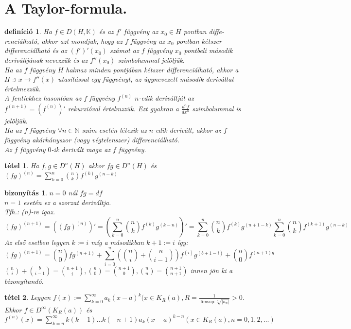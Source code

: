 \documentclass{article}
\newcommand{\K}{\mathbb{K}}
\newcommand{\N}{\mathbb{N}}
\newcommand{\n}{\rightarrow}
\newcommand{\di}{\displaystyle}
\theoremstyle{magyar}
\newtheorem{de}{definíció}[section]
\newtheorem{te}{tétel}[section]
\newtheorem{bi}{bizonyítás}[section]
\begin{document}
  \section{A Taylor-formula.}
  \begin{de}
    Ha $f\in D(H,\K)$ és az $f'$ függvény az $x_0\in H$ pontban diffe-renciálható, akkor azt mondjuk, hogy az $f$ függvény az $x_0$ pontban kétszer differenciálható és az $(f')'(x_0)$ számot az $f$ függvény $x_0$ pontbeli második deriváltjának nevezzük és az $f''(x_0)$ szimbolummal jelöljük.\\
    Ha az $f$ függvény $H$ halmaz minden pontjában kétszer differenciálható, akkor a $H\ni x\n f''(x)$ utasítással egy függvényt, az úgynevezett második deriváltat értelmezzük.\\
    A fentiekhez hasonlóan az $f$ függvény $f^{(n)}$ $n$-edik deriváltját az $f^{(n+1)}=(f^{(n)})'$ rekurzióval értelmzzük. Ezt gyakran a $\di\frac{d^nf}{dx^n}$ szimbolummal is jelöljük.\\
    Ha az $f$ függvény $\forall n\in\N$ szám esetén létezik az $n$-edik derivált, akkor az $f$ függvény akárhányszor (vagy végtelenszer) differenciálható.\\
    Az $f$ függvény $0$-ik derivált maga az $f$ függvény.
  \end{de}
  \begin{te}
    Ha $f,g\in D^n(H)$ akkor $fg\in D^n(H)$ és $(fg)^{(n)}=\di\sum_{k=0}^n\binom{n}{k}f^{(k)}g^{(n-k)}$
  \end{te}
  \begin{bi}
    $n=0$ nál $fg=df$\\
    $n=1$ esetén ez a szorzat deriváltja.\\
    Tfh.: (n)-re igaz.
    \[ (fg)^{(n+1)}=((fg)^{(n)})'=(\sum_{k=0}^n\binom{n}{k}f^{(k)}g^{(k-n)})'=\sum_{k=0}^n\binom{n}{k}f^{(k)}g^{(n+1-k)}\sum_{k=0}^n\binom{n}{k}f^{(k+1)}g^{(n-k)}\]
    Az első esetben legyen $k:=i$ míg a másodikban $k+1:=i$ így:
    \[ (fg)^{(n+1)}=\binom{n}{0} fg^{(n+1)}+\sum_{i=0}^n(\binom{n}{i}+\binom{n}{i-1})f^{(i)}g^{(b+1-i)}+\binom{n}{0} f^{(n+1)g}\]
    $\binom{n}{i}+\binom{b}{i-1}=\binom{n+1}{i}, \binom{n}{0}=\binom{n+1}{0}, \binom{n}{n}=\binom{n+1}{n+1}$ innen jön ki a bizonyítandó.
  \end{bi}
  \begin{te}
    Legyen $f(x):=\di\sum_{k=0}^\infty a_k(x-a)^k (x\in K_R(a), R=\frac1{\limsup{\sqrt[n]{|a_n|}}}>0$.
    Ekkor $f\in D^{\infty}(K_R(a))$ és $f^{(n)}(x)=\di\sum_{k=n}^\infty k(k-1)\ldots k(-n+1)a_k(x-a)^{k-n}  (x\in K_R(a), n=0,1,2,\ldots)$
  \end{te}
\end{document}
